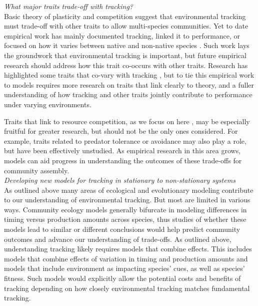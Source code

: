 \documentclass[11pt,letterpaper]{article}
\newcommand{\R}[1]{\label{#1}\linelabel{#1}}
\begin{document}
\emph{What major traits trade-off with tracking?} \\ 
\R{fdtradeoffsstart}Basic theory of plasticity and competition suggest that environmental tracking must trade-off with other traits to allow multi-species communities. Yet to date empirical work has mainly documented tracking, linked it to performance, or focused on how it varies between native and non-native species \citep{Willis:2010al,wolkovichAmBot2013,Zettlemoyer2019}. Such work lays the groundwork that environmental tracking is important, but future empirical research should address how this trait co-occurs with other traits. Research has highlighted some traits that co-vary with tracking \citep[e.g.,][]{kharouba2014,lasky2016,Zhu2016BioLetters}, but to tie this empirical work to models requires more research on traits that link clearly to theory, and a fuller understanding of how tracking and other traits jointly contribute to performance under varying environments. 

Traits that link to resource competition, as we focus on here \citep[as others have as well, see][]{volkerass}, may be especially fruitful for greater research, but should not be the only ones considered. For example, traits related to predator tolerance or avoidance may also play a role, but have been effectively unstudied.  As empirical research in this area grows, models can aid progress in understanding the outcomes of these trade-offs for community assembly. \R{fdtradeoffsend}\\ 

\emph{Developing new models for tracking in stationary to non-stationary systems} \\ 
As outlined above many areas of ecological and evolutionary modeling contribute to our understanding of environmental tracking. But most are limited in various ways. Community ecology models generally bifurcate in modeling differences in timing versus production amounts across species, thus studies of whether these models lead to similar or different conclusions would help predict community outcomes and advance our understanding of trade-offs. As outlined above, understanding tracking likely requires models that combine effects. This includes models that combine effects of variation in timing and production amounts and models that include environment as impacting species' cues, as well as species' fitness. Such models would explicitly allow the potential costs and benefits of tracking \R{modelcosts3} depending on how closely environmental tracking matches fundamental tracking.
\end{document}
